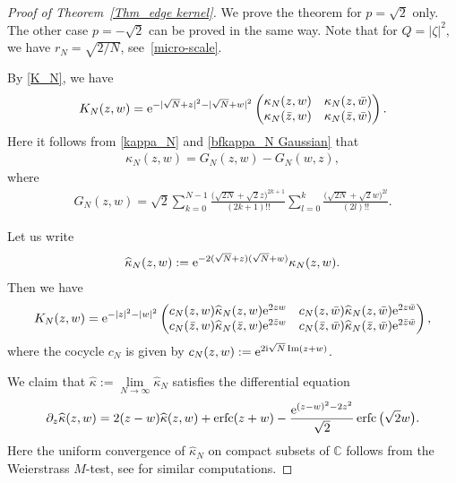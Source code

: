 \documentclass[pdftex]{sigma}
\numberwithin{equation}{section}
\newcommand{\erfc}{\operatorname{erfc}}
\newcommand{\C}{{\mathbb C}}
\newcommand{\im}{\operatorname{Im}}
\newcommand{\1}{\chi}
\begin{document}
\begin{proof}[Proof of Theorem~\ref{Thm_edge kernel}]
	We prove the theorem for $p =\sqrt{2}$ only. The other case $p=-\sqrt{2}$ can be proved in the same way.
	Note that for $Q=|\zeta|^2,$ we have $r_N=\sqrt{2/N}$, see~\eqref{micro-scale}.
	
	By \eqref{K_N}, we have
	\begin{gather*}
		K_N(z,w)={\rm e}^{ - |\sqrt{N}+z|^2-|\sqrt{N}+w|^2 } \begin{pmatrix}
			\kappa_N(z,w) & \kappa_N(z,\bar{w}) \\
			\kappa_N(\bar{z},w) & \kappa_N(\bar{z},\bar{w})
		\end{pmatrix}.
	\end{gather*}
	Here it follows from \eqref{kappa_N} and \eqref{bfkappa_N Gaussian} that
	\begin{gather*}
	\kappa_N(z,w)=G_N(z,w)-G_N(w,z),
	\end{gather*}
	where
	\begin{gather} \label{kappa tilde}
	G_N(z,w)=\sqrt{2} \sum_{k=0}^{N-1} \frac{\big( \sqrt{2N}+\sqrt{2}z \big)^{2k+1}}{(2k+1)!!} \sum_{l=0}^k \frac{\big( \sqrt{2N}+\sqrt{2} w\big)^{2l} }{(2l)!!}.
	\end{gather}
	
	Let us write
	\begin{gather} \label{kappa hat, tilde}
		\widehat{\kappa}_N(z,w):= {\rm e}^{ -2( \sqrt{N}+ z)( \sqrt{N}+ w) } \kappa_N(z,w).
	\end{gather}
	Then we have
	\begin{gather*}
		K_N(z,w)={\rm e}^{ - |z|^2-|w|^2 } \begin{pmatrix}
			c_N(z,w)\widehat{\kappa}_N(z,w) {\rm e}^{2zw} & c_N(z,\bar{w}) \widehat{\kappa}_N(z,\bar{w}) {\rm e}^{2z\bar{w}} \\
			c_N(\bar{z},w)\widehat{\kappa}_N(\bar{z},w) {\rm e}^{2\bar{z}w} & c_N(\bar{z},\bar{w}) \widehat{\kappa}_N(\bar{z},\bar{w}) {\rm e}^{2\bar{z}\bar{w}}
		\end{pmatrix},
	\end{gather*}
	where the cocycle $c_N$ is given by
	$c_N(z,w):={\rm e}^{ 2{\rm i}\sqrt{N}\im(z+w) }$.
	
	We claim that $\widehat{\kappa}:=\lim\limits_{N \to \infty} \widehat{\kappa}_N$ satisfies the differential equation
	\begin{gather} \label{kappa hat pde 1 edge}
		\partial_z \widehat{\kappa}(z,w)=2(z-w) \widehat{\kappa}(z,w)+\erfc(z+w)-\frac{ {\rm e}^{ (z-w)^2-2z^2 } }{\sqrt{2}} \erfc\big(\sqrt{2}w\big).
	\end{gather}
	Here the uniform convergence of $\widehat{\kappa}_N$ on compact subsets of $\C$ follows from the Weierstrass $M$-test, see \cite[Section 4]{akemann2021skew} for similar computations.
	

\end{proof}
\end{document}
